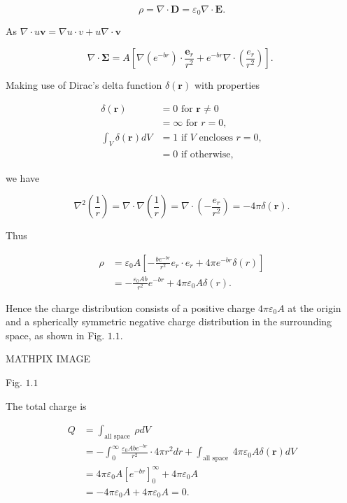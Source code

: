 \documentclass[10pt]{article}
\begin{document}
$$
\rho=\nabla \cdot \mathbf{D}=\varepsilon_{0} \nabla \cdot \mathbf{E} .
$$

As $\nabla \cdot u \mathbf{v}=\nabla u \cdot v+u \nabla \cdot \mathbf{v}$

$$
\nabla \cdot \mathbf{\Sigma}=A\left[\nabla\left(e^{-b r}\right) \cdot \frac{\mathbf{e}_{r}}{r^{2}}+e^{-b r} \nabla \cdot\left(\frac{e_{r}}{r^{2}}\right)\right] \text {. }
$$

Making use of Dirac's delta function $\delta(\mathbf{r})$ with properties

$$
\begin{aligned}
\delta(\mathbf{r}) &=0 \text { for } \mathbf{r} \neq 0 \\
&=\infty \text { for } r=0, \\
\int_{V} \delta(\mathbf{r}) d V &=1 \text { if } V \text { encloses } r=0, \\
&=0 \text { if otherwise, }
\end{aligned}
$$

we have

$$
\nabla^{2}\left(\frac{1}{r}\right)=\nabla \cdot \nabla\left(\frac{1}{r}\right)=\nabla \cdot\left(-\frac{e_{r}}{r^{2}}\right)=-4 \pi \delta(\mathbf{r}) .
$$

Thus

$$
\begin{aligned}
\rho &=\varepsilon_{0} A\left[-\frac{b e^{-b r}}{r^{2}} e_{r} \cdot e_{r}+4 \pi e^{-b r} \delta(r)\right] \\
&=-\frac{\varepsilon_{0} A b}{r^{2}} e^{-b r}+4 \pi \varepsilon_{0} A \delta(r) .
\end{aligned}
$$

Hence the charge distribution consists of a positive charge $4 \pi \varepsilon_{0} A$ at the origin and a spherically symmetric negative charge distribution in the surrounding space, as shown in Fig. $1.1$.

MATHPIX IMAGE

Fig. $1.1$

 The total charge is

$$
\begin{aligned}
Q &=\int_{\text {all space }} \rho d V \\
&=-\int_{0}^{\infty} \frac{\varepsilon_{0} A b e^{-b r}}{r^{2}} \cdot 4 \pi r^{2} d r+\int_{\text {all space }} 4 \pi \varepsilon_{0} A \delta(\mathbf{r}) d V \\
&=4 \pi \varepsilon_{0} A\left[e^{-b r}\right]_{0}^{\infty}+4 \pi \varepsilon_{0} A \\
&=-4 \pi \varepsilon_{0} A+4 \pi \varepsilon_{0} A=0 .
\end{aligned}
$$
\end{document}
